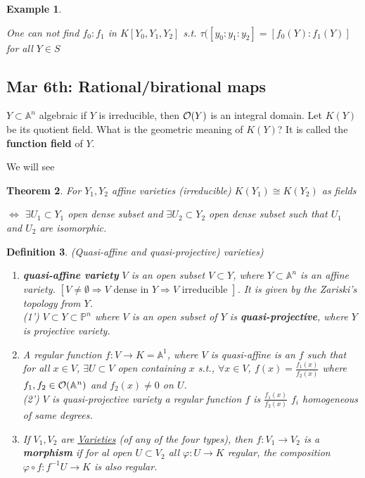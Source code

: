 \documentclass[11pt]{article}
\newtheorem{thm}{Theorem}[section]
\newtheorem{dfn}[thm]{Definition}
\newtheorem{ex}[thm]{Example}
\newcommand{\affn}{\mathbb A}
\newcommand{\proj}{\mathbb P}
\newcommand{\calo}{{\cal O}}
\newcommand{\Lrta}{\Longrightarrow}
\newcommand{\lrta}{\longrightarrow}
\newcommand{\Llrta}{\Longleftrightarrow}
\begin{document}
\begin{ex}
\begin{enumerate}[label=(\arabic*)]
One can not find $f_0:f_1$ in $K[Y_0,Y_1,Y_2]$ s.t. $\tau([y_0:y_1:y_2]=[f_0(Y):f_1(Y)]$ for all $Y\in S$
\end{enumerate}
\end{ex}

\subsection{Mar 6th: Rational/birational maps}

$Y\subset \affn^n$ algebraic if $Y$ is irreducible, then $\calo(Y)$ is an integral domain. Let $K(Y)$ be its quotient field. What is the geometric meaning of $K(Y)$? It is called the \textbf{function field} of $Y$.

We will see
\begin{thm}
For $Y_1,Y_2$ affine varieties (irreducible) $K(Y_1)\cong K(Y_2)$ as fields

$\Llrta$ $\exists U_1\subset Y_1$ open dense subset and $\exists U_2\subset Y_2$ open dense subset such that $U_1$ and $U_2$ are isomorphic.
\end{thm}
\begin{dfn}
(Quasi-affine  and quasi-projective) varieties)
\begin{enumerate}%
  \item \textbf{quasi-affine variety} $V$ is an open subset $V\subset Y$, where $Y\subset \affn^n$ is an affine variety. $[V\neq \emptyset\Lrta V\text{ dense in } Y\Lrta V\text{ irreducible }]$. It is given by the Zariski's topology from $Y$.\\
  (1') $V\subset Y\subset \proj^n$ where $V$ is an open subset of $Y$ is \textbf{quasi-projective}, where $Y$ is projective variety.
  \item A regular function $f:V\lrta K=\affn^1$, where $V$ is quasi-affine is an $f$ such that for all $x\in V$, $\exists U\subset V$ open containing $x$ s.t., $\forall x\in V$, $f(x)=\frac{f_1(x)}{f_2(x)}$ where $f_1,f_2\in\calo(\affn^n)$ and $f_2(x)\neq 0$ on $U$.\\
  (2') $V$ is quasi-projective variety a regular function $f$ is $\frac{f_1(x)}{f_2(x)}$ $f_i$ homogeneous of same degrees.
  \item If $V_1,V_2$ are \underline{Varieties} (of any of the four types), then $f:V_1\lrta V_2$ is a \textbf{morphism} if for al open $U\subset V_2$ all $\varphi:U\lrta K$ regular, the composition $\varphi\circ f: f^{-1}U\lrta K$ is also regular.
  \end{enumerate}
\end{dfn}
\end{document}
